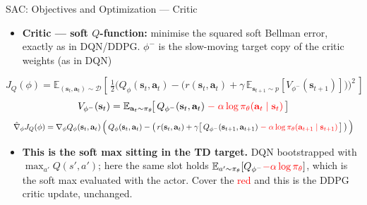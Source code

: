 \begin{frame}{SAC: Objectives and Optimization --- Critic}
\small
\begin{itemize}
    \item \textbf{Critic --- soft $Q$-function:} minimise the squared soft Bellman error, exactly as in DQN/DDPG. $\phi^{-}$ is the slow-moving target copy of the critic weights (as in DQN)
\end{itemize}
\[
J_Q(\phi) = \mathbb{E}_{(\mathbf{s}_t, \mathbf{a}_t) \sim \mathcal{D}}\!\left[\, \tfrac{1}{2}\Big( Q_\phi(\mathbf{s}_t, \mathbf{a}_t) - \big( r(\mathbf{s}_t, \mathbf{a}_t) + \gamma\, \mathbb{E}_{\mathbf{s}_{t+1} \sim p}\!\left[ V_{\phi^{-}}(\mathbf{s}_{t+1}) \right] \big) \Big)^{2} \,\right]
\]
\[
V_{\phi^{-}}(\mathbf{s}_t) = \mathbb{E}_{\mathbf{a}_t \sim \pi_\theta}\!\big[\, Q_{\phi^{-}}(\mathbf{s}_t, \mathbf{a}_t) \; \textcolor{red}{-\; \alpha \log \pi_\theta(\mathbf{a}_t \mid \mathbf{s}_t)} \,\big]
\]
\[
\resizebox{\linewidth}{!}{$\displaystyle
\hat{\nabla}_\phi J_Q(\phi) = \nabla_\phi Q_\phi(\mathbf{s}_t, \mathbf{a}_t)\,\Big(\, Q_\phi(\mathbf{s}_t, \mathbf{a}_t) - \big(\, r(\mathbf{s}_t, \mathbf{a}_t) + \gamma\big[\, Q_{\phi^{-}}(\mathbf{s}_{t+1}, \mathbf{a}_{t+1}) \; \textcolor{red}{-\; \alpha \log\pi_\theta(\mathbf{a}_{t+1} \mid \mathbf{s}_{t+1})} \,\big]\, \big) \,\Big)
$}
\]
\vspace{-0.3em}
\begin{itemize}
    \item[$\Rightarrow$] {\footnotesize \textbf{This is the soft max sitting in the TD target.} DQN bootstrapped with $\max_{a'}Q(s',a')$; here the same slot holds $\mathbb{E}_{a'\sim\pi_\theta}[Q_{\phi^{-}} \textcolor{red}{- \alpha\log\pi_\theta}]$, which is the soft max evaluated with the actor. Cover the \textcolor{red}{red} and this is the DDPG critic update, unchanged.}
\end{itemize}
\end{frame}

